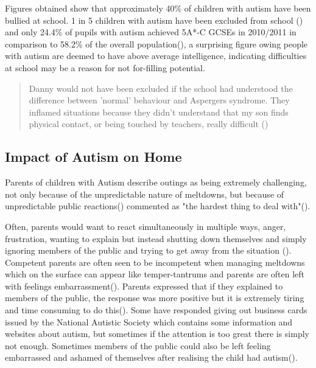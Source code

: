\documentclass[11pt]{report}
\begin{document}
Figures obtained show that approximately 40\% of children with autism have been bullied at school. 1 in 5 children with autism have been excluded from school (\cite{nasschool}) and only 24.4\% of pupils with autism achieved 5A*-C GCSEs in 2010/2011 in comparison to 58.2\% of the overall population(\cite{statsandfacts}), a surprising figure owing people with autism are deemed to have above average intelligence, indicating difficulties at school may be a reason for not for-filling potential. 

\begin{quote}
Danny would not have been excluded if the school had understood the difference between 'normal' behaviour and Aspergers syndrome. They inflamed situations because they didn't understand that my son finds physical contact, or being touched by teachers, really difficult (\cite{nasschool})
\end{quote}


\subsection{Impact of Autism on Home}
Parents of children with Autism describe outings as being extremely challenging, not only because of the unpredictable nature of meltdowns, but because of unpredictable public reactions(\cite{meltdowns_goingout}) commented as "the hardest thing to deal with"(\cite{meltdowns_goingout}).

Often, parents would want to react simultaneously in multiple ways, anger, frustration, wanting to explain but instead shutting down themselves and simply ignoring members of the public and trying to get away from the situation (\cite{meltdowns_goingout}). Competent parents are often seen to be incompetent when managing meltdowns which on the surface can appear like temper-tantrums and parents are often left with feelings embarrassment(\cite{meltdowns_goingout}). Parents expressed that if they explained to members of the public, the response was more positive but it is extremely tiring and time consuming to do this(\cite{meltdowns_goingout}). Some have responded giving out business cards issued by the National Autistic Society which contains some information and websites about autism, but sometimes if the attention is too great there is simply not enough. Sometimes members of the public could also be left feeling embarrassed and ashamed of themselves after realising the child had autism(\cite{meltdowns_goingout}).  
\end{document}
